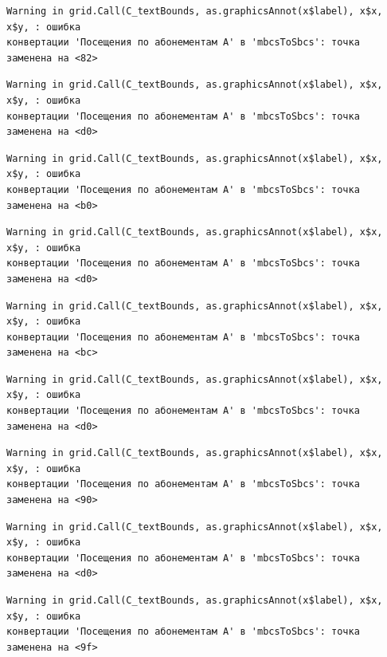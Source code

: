 \documentclass[
  letterpaper,
  DIV=11,
  numbers=noendperiod]{scrreprt}
\begin{document}
\begin{verbatim}
Warning in grid.Call(C_textBounds, as.graphicsAnnot(x$label), x$x, x$y, : ошибка
конвертации 'Посещения по абонементам А' в 'mbcsToSbcs': точка заменена на <82>
\end{verbatim}

\begin{verbatim}
Warning in grid.Call(C_textBounds, as.graphicsAnnot(x$label), x$x, x$y, : ошибка
конвертации 'Посещения по абонементам А' в 'mbcsToSbcs': точка заменена на <d0>
\end{verbatim}

\begin{verbatim}
Warning in grid.Call(C_textBounds, as.graphicsAnnot(x$label), x$x, x$y, : ошибка
конвертации 'Посещения по абонементам А' в 'mbcsToSbcs': точка заменена на <b0>
\end{verbatim}

\begin{verbatim}
Warning in grid.Call(C_textBounds, as.graphicsAnnot(x$label), x$x, x$y, : ошибка
конвертации 'Посещения по абонементам А' в 'mbcsToSbcs': точка заменена на <d0>
\end{verbatim}

\begin{verbatim}
Warning in grid.Call(C_textBounds, as.graphicsAnnot(x$label), x$x, x$y, : ошибка
конвертации 'Посещения по абонементам А' в 'mbcsToSbcs': точка заменена на <bc>
\end{verbatim}

\begin{verbatim}
Warning in grid.Call(C_textBounds, as.graphicsAnnot(x$label), x$x, x$y, : ошибка
конвертации 'Посещения по абонементам А' в 'mbcsToSbcs': точка заменена на <d0>
\end{verbatim}

\begin{verbatim}
Warning in grid.Call(C_textBounds, as.graphicsAnnot(x$label), x$x, x$y, : ошибка
конвертации 'Посещения по абонементам А' в 'mbcsToSbcs': точка заменена на <90>
\end{verbatim}

\begin{verbatim}
Warning in grid.Call(C_textBounds, as.graphicsAnnot(x$label), x$x, x$y, : ошибка
конвертации 'Посещения по абонементам А' в 'mbcsToSbcs': точка заменена на <d0>
\end{verbatim}

\begin{verbatim}
Warning in grid.Call(C_textBounds, as.graphicsAnnot(x$label), x$x, x$y, : ошибка
конвертации 'Посещения по абонементам А' в 'mbcsToSbcs': точка заменена на <9f>
\end{verbatim}
\end{document}
